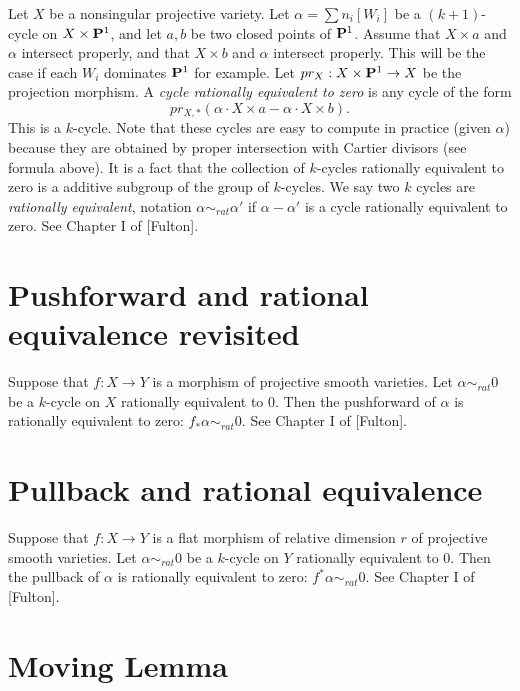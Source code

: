 \noindent
Let $X$ be a nonsingular projective variety.
Let $\alpha = \sum n_i [W_i]$ be a $(k+1)$-cycle on $X \times {\bf P}^1$,
and let $a,b$ be two closed points of ${\bf P}^1$. Assume
that $X \times a$ and $\alpha$ intersect properly, and that
$X \times b$ and $\alpha$ intersect properly. This will be the
case if each $W_i$ dominates ${\bf P}^1$ for example. Let
$pr_X : X \times {\bf P}^1 \to X$ be the projection morphism.
A {\it cycle rationally equivalent to zero} is any cycle
of the form 
$$
pr_{X,*}( \alpha \cdot X\times a - \alpha \cdot X\times b).
$$
This is a $k$-cycle.
Note that these cycles are easy to compute in practice (given $\alpha$)
because they are obtained by proper intersection with Cartier divisors
(see formula above). It is a fact that the collection of $k$-cycles rationally
equivalent to zero is a additive subgroup of the group of $k$-cycles.
We say two $k$ cycles are {\it rationally equivalent}, notation
$\alpha \sim_{rat} \alpha'$ if $\alpha - \alpha'$ is a cycle rationally
equivalent to zero. See Chapter I of [Fulton].

\section{Pushforward and rational equivalence revisited}
\label{section-pushforward-rational-equivalence}

\noindent
Suppose that $f : X \to Y$ is a morphism
of projective smooth varieties. 
Let $\alpha \sim_{rat} 0$ be a $k$-cycle on
$X$ rationally equivalent to $0$. Then the {pushforward}
of $\alpha$ is rationally equivalent to zero:
$f_* \alpha \sim_{rat} 0$. See Chapter I of [Fulton].


\section{Pullback and rational equivalence}
\label{section-pullback-rational-equivalence}

\noindent
Suppose that $f : X \to Y$ is a flat morphism of relative dimension $r$
of projective smooth varieties. 
Let $\alpha \sim_{rat} 0$ be a $k$-cycle on
$Y$ rationally equivalent to $0$. Then the pullback
of $\alpha$ is rationally equivalent to zero:
$f^* \alpha \sim_{rat} 0$. See Chapter I of [Fulton].

\section{Moving Lemma}
\label{section-moving-lemma}

